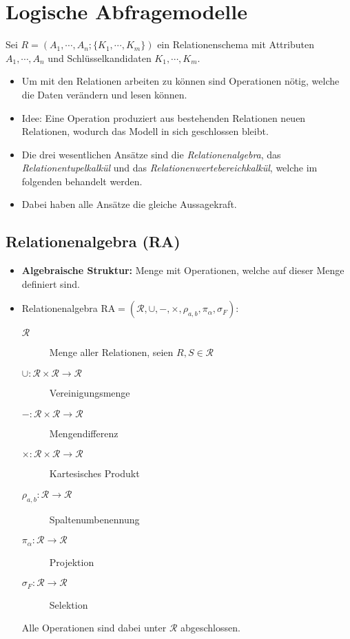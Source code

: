 \chapter{Logische Abfragemodelle} %
	\label{c:logicquery}

	Sei \( R = (A_1, \cdots, A_n; \{ K_1, \cdots, K_m \}) \) ein Relationenschema mit Attributen \( A_1, \cdots, A_n \) und Schlüsselkandidaten \( K_1, \cdots, K_m \).

	\begin{itemize}
		\item Um mit den Relationen arbeiten zu können sind Operationen nötig, welche die Daten verändern und lesen können.
		\item Idee: Eine Operation produziert aus bestehenden Relationen neuen Relationen, wodurch das Modell in sich geschlossen bleibt.
		\item Die drei wesentlichen Ansätze sind die \textit{Relationenalgebra}, das \textit{Relationentupelkalkül} und das \textit{Relationenwertebereichkalkül}, welche im folgenden behandelt werden.
		\item Dabei haben alle Ansätze die gleiche Aussagekraft.
	\end{itemize}

	\section{Relationenalgebra (RA)} %
		\begin{itemize}
			\item \textbf{Algebraische Struktur:} Menge mit Operationen, welche auf dieser Menge definiert sind.
			\item Relationenalgebra \( \text{RA} = (\mathcal{R}, \cup, -, \times, \rho_{a,b}, \pi_\alpha, \sigma_F) \):
				\begin{description}
					\item[\( \mathcal{R} \)] Menge aller Relationen, seien \( R, S \in \mathcal{R} \)
					\item[\( \cup : \mathcal{R} \times \mathcal{R} \rightarrow \mathcal{R} \)] Vereinigungsmenge
					\item[\( - : \mathcal{R} \times \mathcal{R} \rightarrow \mathcal{R} \)] Mengendifferenz
					\item[\( \times : \mathcal{R} \times \mathcal{R} \rightarrow \mathcal{R} \)] Kartesisches Produkt
					\item[\( \rho_{a,b} : \mathcal{R} \rightarrow \mathcal{R} \)] Spaltenumbenennung
					\item[\( \pi_\alpha : \mathcal{R} \rightarrow \mathcal{R} \)] Projektion
					\item[\( \sigma_F : \mathcal{R} \rightarrow \mathcal{R} \)] Selektion
				\end{description}
				Alle Operationen sind dabei unter \( \mathcal{R} \) abgeschlossen.
		\end{itemize}

